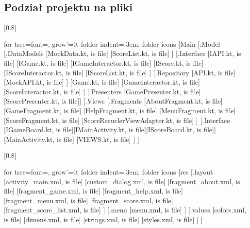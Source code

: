 \documentclass[12pt,a4paper]{article}
\begin{document}
		\subsection{Podział projektu na pliki}
		\begin{multicols}{2}
\scalebox{0.9}[0.8]{
			\begin{forest}
				for tree={font=\sffamily, grow'=0,
    folder indent=.3em, folder icons}
    	[Main
    	    [.Model
    	        [.DataModels
    	        [MockData.kt, is file]
    	        [ScoreList.kt, is file]
    	        ]
    	        [.Interface
    	        [IAPI.kt, is file]
    	        [IGame.kt, is file]
    	        [IGameInteractor.kt, is file]
    	        [IScore.kt, is file]
    	        [IScoreInteractor.kt, is file]
    	        [IScoreList.kt, is file]
    	        ]
    	        [.Repository
    	        [API.kt, is file]
    	        [MockAPI.kt, is file]
    	        ]
    	        [Game.kt, is file]
    	        [GameInteractor.kt, is file]
    	        [ScoreInteractor.kt, is file]
    	    ]
    	    [.Presenters
    	    [GamePresenter.kt, is file][ScorePresenter.kt, is file]]
    	    [.Views
    	    [.Fragments
    	    [AboutFragment.kt, is file]
    	    [GameFragment.kt, is file]
    	    [HelpFragment.kt, is file]
    	    [MenuFragment.kt, is file]
    	    [ScoreFragment.kt, is file]
    	    [ScoreRecuclerViewAdapter.kt, is file]
    	    ]
    	    [.Interface [IGameBoard.kt, is file][IMainActivity.kt, is file][IScoreBoard.kt, is file]]
    	    [MainActivity.kt, is file]
    	    [VIEWS.kt, is file]
    	    ]
    	]
			\end{forest}
			}
\scalebox{0.9}[0.8]{
			\begin{forest}
				for tree={font=\sffamily, grow'=0,
                folder indent=.3em, folder icons}
    [res
        [.layout 
            [activity\_main.xml, is file]
            [custom\_dialog.xml, is file]
            [fragment\_about.xml, is file]
            [fragment\_game.xml, is file]
            [fragment\_help.xml, is file]
            [fragment\_menu.xml, is file]
            [fragment\_score.xml, is file]
            [fragment\_score\_list.xml, is file]
        ]
        [.menu 
            [menu.xml, is file]
        ]
        [.values
            [colors.xml, is file]
            [dimens.xml, is file]
            [strings.xml, is file]
            [styles.xml, is file]
        ]
    ]
    \end{forest}
}
		\end{multicols}
\clearpage 
\end{document}
